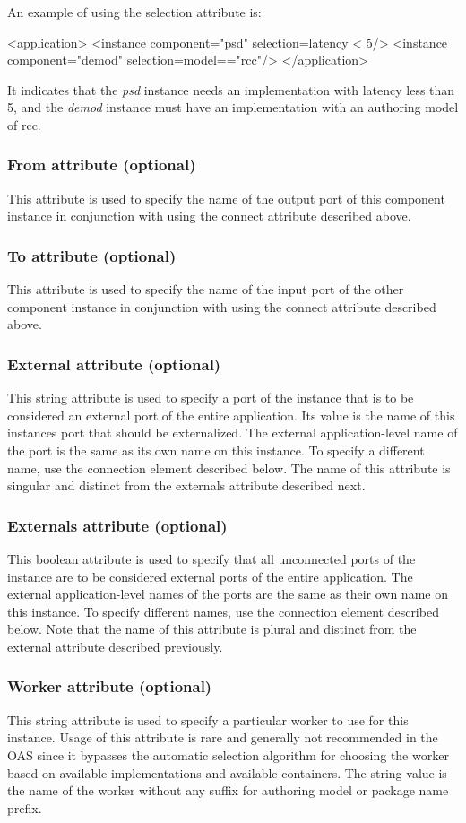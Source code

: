 \documentclass[10pt, a4paper, oneside]{article}
\renewcommand\_{\textunderscore\allowbreak} %
\begin{document}
An example of using the selection attribute is:\begin{ocpixml}
<application>
  <instance component="psd" selection=latency < 5/>
  <instance component="demod" selection=model=="rcc"/>
</application>\end{ocpixml}
It indicates that the \emph{psd} instance needs an implementation with latency less than 5, and the \emph{demod} instance must have an implementation with an authoring model of rcc.
\subsubsection{From attribute (optional)}This attribute is used to specify the name of the output port of this component instance in conjunction with using the connect attribute described above.
\subsubsection{To attribute (optional)} This attribute is used to specify the name of the input port of the other component instance in conjunction with using the connect attribute described above.
\subsubsection{External attribute (optional)} This string attribute is used to specify a port of the instance that is to be considered an external port of the entire application.  Its value is the name of this instances port that should be externalized.  The external application-level name of the port is the same as its own name on this instance.  To specify a different name, use the connection element described below. The name of this attribute is singular and distinct from the externals attribute described next.
\subsubsection{Externals attribute (optional)} This boolean attribute is used to specify that all unconnected ports of the instance are to be considered external ports of the entire application.  The external application-level names of the ports are the same as their own name on this instance. To specify different names, use the connection element described below.  Note that the name of this attribute is plural and distinct from the external attribute described previously.
\subsubsection{Worker attribute (optional)} This string attribute is used to specify a particular worker to use for this instance. Usage of this attribute is rare and generally not recommended in the OAS since it bypasses the automatic selection algorithm for choosing the worker based on available implementations and available containers.  The string value is the name of the worker without any suffix for authoring model or package name prefix.
\end{document}
